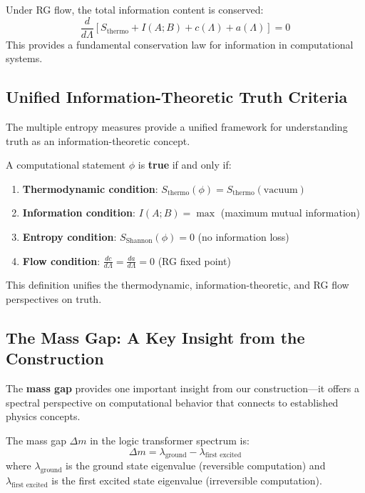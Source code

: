 \begin{theorem}
\label{thm:info-flow-conservation}
Under RG flow, the total information content is conserved:
\[
\frac{d}{d\Lambda} \left[ S_{\text{thermo}} + I(A;B) + c(\Lambda) + a(\Lambda) \right] = 0
\]
This provides a fundamental conservation law for information in computational systems.
\end{theorem}

\subsection{Unified Information-Theoretic Truth Criteria}

The multiple entropy measures provide a unified framework for understanding truth as an information-theoretic concept.

\begin{definition}
\label{def:info-truth}
A computational statement $\phi$ is \textbf{true} if and only if:
\begin{enumerate}
\item \textbf{Thermodynamic condition}: $S_{\text{thermo}}(\phi) = S_{\text{thermo}}(\text{vacuum})$
\item \textbf{Information condition}: $I(A;B) = \max$ (maximum mutual information)
\item \textbf{Entropy condition}: $S_{\text{Shannon}}(\phi) = 0$ (no information loss)
\item \textbf{Flow condition}: $\frac{dc}{d\Lambda} = \frac{da}{d\Lambda} = 0$ (RG fixed point)
\end{enumerate}
\end{definition}

This definition unifies the thermodynamic, information-theoretic, and RG flow perspectives on truth.

\subsection{The Mass Gap: A Key Insight from the Construction}

The \textbf{mass gap} provides one important insight from our construction—it offers a spectral perspective on computational behavior that connects to established physics concepts.

\begin{definition}
\label{def:mass-gap-spectrum}
The mass gap $\Delta m$ in the logic transformer spectrum is:
\[
\Delta m = \lambda_{\text{ground}} - \lambda_{\text{first excited}}
\]
where $\lambda_{\text{ground}}$ is the ground state eigenvalue (reversible computation) and $\lambda_{\text{first excited}}$ is the first excited state eigenvalue (irreversible computation).
\end{definition}

